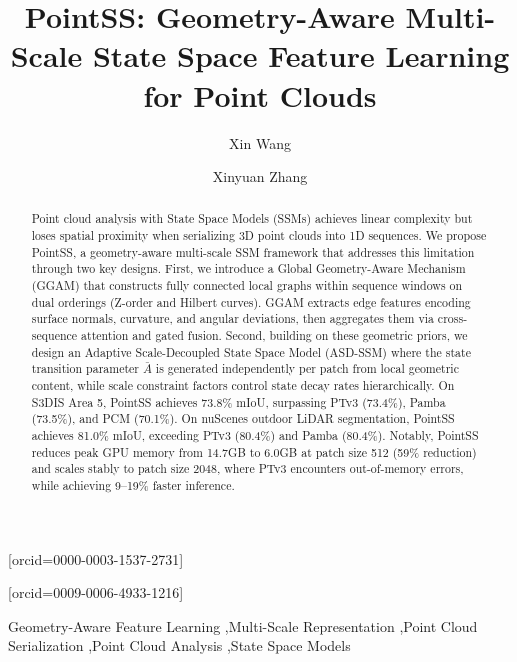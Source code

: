 \documentclass[a4paper,fleqn]{cas-sc}
\begin{document}
\let\WriteBookmarks\relax
\def\floatpagepagefraction{1}
\def\textpagefraction{.001}

\title [mode = title]{PointSS: Geometry-Aware Multi-Scale State Space Feature Learning for Point Clouds}
\author[1,2,3]{Xin Wang}[orcid=0000-0003-1537-2731]
\cormark[1]
\author[1]{Xinyuan Zhang}[orcid=0009-0006-4933-1216]


\begin{abstract}
Point cloud analysis with State Space Models (SSMs) achieves linear complexity but loses spatial proximity when serializing 3D point clouds into 1D sequences. We propose PointSS, a geometry-aware multi-scale SSM framework that addresses this limitation through two key designs. First, we introduce a Global Geometry-Aware Mechanism (GGAM) that constructs fully connected local graphs within sequence windows on dual orderings (Z-order and Hilbert curves). GGAM extracts edge features encoding surface normals, curvature, and angular deviations, then aggregates them via cross-sequence attention and gated fusion. Second, building on these geometric priors, we design an Adaptive Scale-Decoupled State Space Model (ASD-SSM) where the state transition parameter $\bar{A}$ is generated independently per patch from local geometric content, while scale constraint factors control state decay rates hierarchically. On S3DIS Area 5, PointSS achieves 73.8\% mIoU, surpassing PTv3 (73.4\%), Pamba (73.5\%), and PCM (70.1\%). On nuScenes outdoor LiDAR segmentation, PointSS achieves 81.0\% mIoU, exceeding PTv3 (80.4\%) and Pamba (80.4\%). Notably, PointSS reduces peak GPU memory from 14.7GB to 6.0GB at patch size 512 (59\% reduction) and scales stably to patch size 2048, where PTv3 encounters out-of-memory errors, while achieving 9--19\% faster inference.
\end{abstract}


\begin{keywords}
Geometry-Aware Feature Learning \sep Multi-Scale Representation \sep Point Cloud Serialization \sep Point Cloud Analysis \sep State Space Models
\end{keywords}
\end{document}

